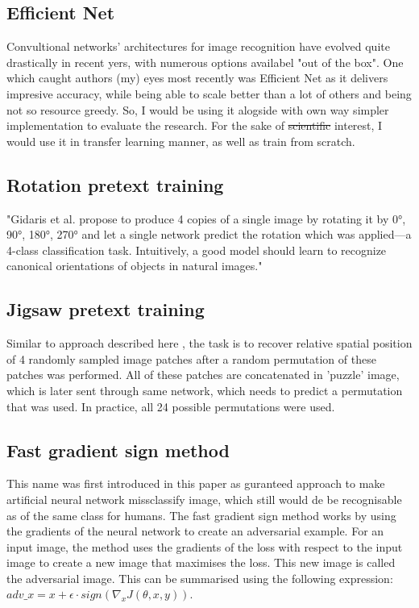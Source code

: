 \subsection{Efficient Net}
Convultional networks' architectures for image recognition have evolved quite drastically in recent yers, with numerous options availabel "out of the box".
One which caught authors (my) eyes most recently was Efficient Net \cite{DBLP:journals/corr/abs-1905-11946} as it delivers impresive accuracy, while being able to scale better than a lot of others and being not so resource greedy.
So, I would be using it alogside with own way simpler implementation to evaluate the research. For the sake of \st{scientific} interest, I would use it in transfer learning manner, as well as train from scratch.

\subsection{Rotation pretext training}
\cite{kolesnikov2019revisiting} "Gidaris et al. propose to produce 4 copies of
a single image by rotating it by {0°, 90°, 180°, 270°} and let
a single network predict the rotation which was applied—a
4-class classification task. Intuitively, a good model should
learn to recognize canonical orientations of objects in natural images."

\subsection{Jigsaw pretext training}
Similar to approach described here \cite{kolesnikov2019revisiting},
the task is to recover relative spatial position of
4 randomly sampled image patches after a random permutation of these patches was performed.
All of these patches are concatenated in 'puzzle' image, which is later sent through same network, which needs to predict a permutation that
was used. In practice, all 24 possible permutations were used.

\subsection{Fast gradient sign method}
This name was first introduced in this paper \cite{goodfellow2015explaining} as guranteed approach to make artificial neural network missclassify image, which still would de be recognisable as of the same class for humans. \newline
The fast gradient sign method works by using the gradients of the neural network to create an adversarial example. For an input image, the method uses the gradients of the loss with respect to the input image to create a new image that maximises the loss. This new image is called the adversarial image. This can be summarised using the following expression: $adv\_x = x + \epsilon \cdot sign(\nabla_x J(\theta, x, y))$.



